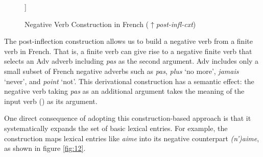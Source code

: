 \documentclass[output=paper]{langsci/langscibook}
\begin{document}
{\begin{exe}
\begin{xlist}
\begin{exe}
\begin{xlist}
\begin{figure}[h!]
	\begin{forest}
		[\begin{avm}
			\[\tp{neg-fin-v}\\
			form & \<(\tpv{ne})\ $+$ \@{2}\>\\
			syn & \[head & \[vform & fin\\
			neg & $+$\]\]\\
			arg-st & \<\@{1}XP\>\ $\oplus$ \<$\textnormal{Adv}_\textnormal{I}$\>\ $\oplus$ L \]
		\end{avm}
			[\begin{avm}
				\[\tpv{fin-v}\\
				form & \<\@{2}\>\\
				syn|head|vform & fin\\
				arg-st &  \<\@{1}XP\>\ $\oplus$ L\]
			\end{avm}]]
	\end{forest}
\caption{Negative Verb Construction in French ($\uparrow${\it post-infl-cxt})}\label{fig:11}
\end{figure}

%
%
\noindent The post-inflection construction allows us
to build a negative verb from a finite verb in French.
That is, a finite verb can give rise to a negative finite
verb that selects an Adv
adverb including \emph{pas} as the second
argument.
Adv includes only a small subset of French negative adverbs such
as \emph{pas}, \emph{plus} `no more', \emph{jamais} `never', and
\emph{point} `not'. This derivational construction has a semantic effect: the
negative verb taking \emph{pas} as an additional argument takes the meaning of
the input verb () as its argument.

One direct consequence of adopting this construction-based approach
is that it systematically expands the set of basic lexical entries.
For example, the construction maps lexical entries like
\emph{aime} into its negative counterpart \emph{(n')aime}, as shown
in figure \ref{fig:12}.


\end{xlist}
\end{exe}
\end{xlist}
\end{exe}}
\end{document}
